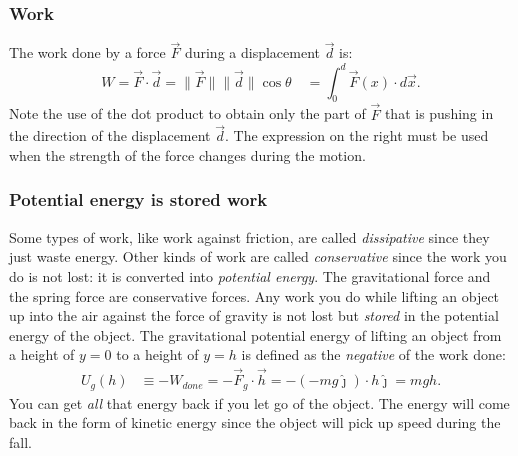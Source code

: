 \documentclass[letterpaper,9pt,journal]{IEEEtran}
\begin{document}
%




%
\subsubsection{Work}

The work done by a force $\vec{F}$ during a displacement $\vec{d}$ is:
\[
  W  = \vec{F}\cdot \vec{d} = \|\vec{F}\|\|\vec{d}\|\cos\theta \quad = \int_0^d \vec{F}(x)\cdot d\vec{x}.
\]
Note the use of the dot product to obtain only the part of $\vec{F}$ that is pushing 
in the direction of the displacement $\vec{d}$.
The expression on the right must be used when the strength of the force 
changes during the motion.


\subsubsection{Potential energy is stored work}

Some types of work, like work against friction, 
are called \emph{dissipative} since they just waste energy.
Other kinds of work are called \emph{conservative} since the work you do
is not lost: it is converted into \emph{potential energy}.
%
The gravitational force and the spring force are conservative forces.
Any work you do while lifting an object up into the air against the force 
of gravity is not lost but \emph{stored} in the potential energy of the object.
The gravitational potential energy of lifting an object from
a height of $y=0$ to a height of $y=h$ is defined as the \emph{negative}
of the work done:
\begin{align}
  U_g(h) &\equiv - W_{done}   = - \vec{F}_g \cdot \vec{h} =  - (- mg \hat{\jmath})\cdot h\hat{\jmath} = mgh.
  \label{GRAVpotENERGY}
\end{align}
You can get \emph{all} that energy back if you let go of the 
object. The energy will come back in the form of kinetic energy since the object
will pick up speed during the fall.
\end{document}

